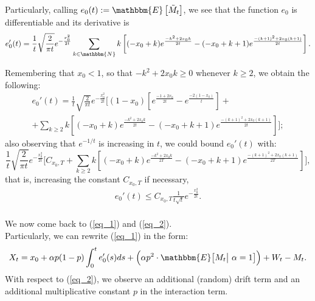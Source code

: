 Particularly, calling $e_0(t) := \mathbbm{E}\left[ \tilde{M}_t \right]$, we see that the function $e_0$ is differentiable and its derivative is \[ e_0'(t) = \frac{1}{t} \sqrt{\frac{2}{\pi t}} e^{- \frac{x_0^2}{2t}} \sum_{k \in \mathbbm{N}} k \left[ (-x_0+k) e^{\frac{-k^2+2x_0k}{2t}} - (-x_0+k+1)e^{\frac{-(k+1)^2+2x_0(k+1)}{2t}} \right]. \]

Remembering that $x_0 < 1$, so that $-k^2 + 2x_0 k \geq 0$ whenever $k \geq 2$, we obtain the following: \begin{multline*} e_0'(t) = \frac{1}{t} \sqrt{\frac{2}{\pi t}} e^{- \frac{x_0^2}{2t}} \Bigg[ (1-x_0) \left[ e^{\frac{-1+2x_0}{2t}} - e^{\frac{-2(1-x_0)}{t}} \right] + \\ + \sum_{k \geq 2} k \left[ (-x_0+k) e^{\frac{-k^2+2x_0k}{2t}} - (-x_0+k+1)e^{\frac{-(k+1)^2+2x_0(k+1)}{2t}} \right] \Bigg]; \end{multline*}
also observing that $e^{-1/t}$ is increasing in $t$, we could bound $e_0'(t)$ with: \[ \frac{1}{t} \sqrt{\frac{2}{\pi t}} e^{- \frac{x_0^2}{2t}} \Bigg[ C_{x_0, T} + \sum_{k \geq 2} k \left[ (-x_0+k) e^{\frac{-k^2+2x_0k}{2T}} - (-x_0+k+1)e^{\frac{-(k+1)^2+2x_0(k+1)}{2T}} \right] \Bigg], \] that is, increasing the constant $C_{x_0, T}$ if necessary, \begin{align*} e_0'(t) \leq C_{x_0, T} \frac{1}{t \sqrt{t}} e^{- \frac{x_0^2}{2t}}. \\ \end{align*}

We now come back to (\ref{eq_1}) and (\ref{eq_2}). \\
Particularly, we can rewrite (\ref{eq_1}) in the form: \begin{equation} \label{eq_1_rew} X_t = x_0 + \alpha p (1-p) \int_0^t e_0'(s) ds + \Big( \alpha p^2 \cdot \mathbbm{E} \big[ M_t \big| \  \alpha = 1 \big. \big] \Big) + W_t - M_t. \end{equation}
With respect to (\ref{eq_2}), we observe an additional (random) drift term and an additional multiplicative constant $p$ in the interaction term. \\

